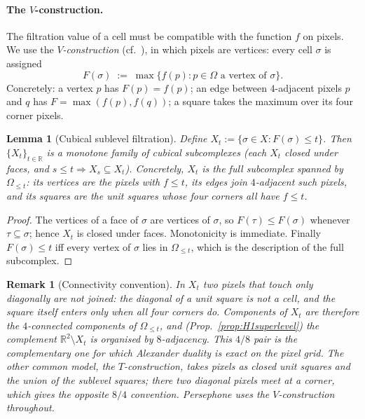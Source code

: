 \documentclass[11pt]{article}
\theoremstyle{persdef}
\newtheorem{lemma}[definition]{Lemma}
\newtheorem{remark}[definition]{Remark}
\newcommand{\R}{\mathbb{R}}
\newcommand{\X}{X}
\newcommand{\sublevL}[2]{#1_{\leq #2}}
\begin{document}
\paragraph{The $V$-construction.} The filtration value of a cell must be compatible with the function $f$ on pixels. We use the \emph{$V$-construction} (cf.\ \cite{WCV12}), in which pixels are vertices: every cell $\sigma$ is assigned
\[
F(\sigma) \;:=\; \max \{ f(p) : p\in\Omega \text{ a vertex of } \sigma\}.
\]
Concretely: a vertex $p$ has $F(p)=f(p)$; an edge between $4$-adjacent pixels $p$ and $q$ has $F=\max(f(p),f(q))$; a square takes the maximum over its four corner pixels.

\begin{lemma}[Cubical sublevel filtration]\label{lem:cubsublev}
Define $\X_t := \{\sigma\in\X : F(\sigma)\leq t\}$. Then $\{\X_t\}_{t\in\R}$ is a monotone family of cubical subcomplexes (each $\X_t$ closed under faces, and $s\leq t\Rightarrow\X_s\subseteq\X_t$). Concretely, $\X_t$ is the full subcomplex spanned by $\sublevL{\Omega}{t}$: its vertices are the pixels with $f\leq t$, its edges join $4$-adjacent such pixels, and its squares are the unit squares whose four corners all have $f\leq t$.
\end{lemma}

\begin{proof}
The vertices of a face of $\sigma$ are vertices of $\sigma$, so $F(\tau)\leq F(\sigma)$ whenever $\tau\subseteq\sigma$; hence $\X_t$ is closed under faces. Monotonicity is immediate. Finally $F(\sigma)\leq t$ iff every vertex of $\sigma$ lies in $\sublevL{\Omega}{t}$, which is the description of the full subcomplex.
\end{proof}

\begin{remark}[Connectivity convention]\label{rem:connectivity}
In $\X_t$ two pixels that touch only diagonally are \emph{not} joined: the diagonal of a unit square is not a cell, and the square itself enters only when all four corners do. Components of $\X_t$ are therefore the $4$-connected components of $\sublevL{\Omega}{t}$, and (Prop.\ \ref{prop:H1superlevel}) the complement $\R^2\setminus\X_t$ is organised by $8$-adjacency. This $4/8$ pair is the complementary one for which Alexander duality is exact on the pixel grid. The other common model, the $T$-construction, takes pixels as closed unit squares and the union of the sublevel squares; there two diagonal pixels meet at a corner, which gives the opposite $8/4$ convention. Persephone uses the $V$-construction throughout.
\end{remark}
\end{document}
